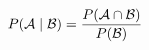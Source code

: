 \begin{equation}
    P( \mathcal{A} \mid \mathcal{B} ) = \frac{P( \mathcal{A} \cap \mathcal{B} )}{P( \mathcal{B} )}
\label{eq:cond_prob}
\end{equation}


